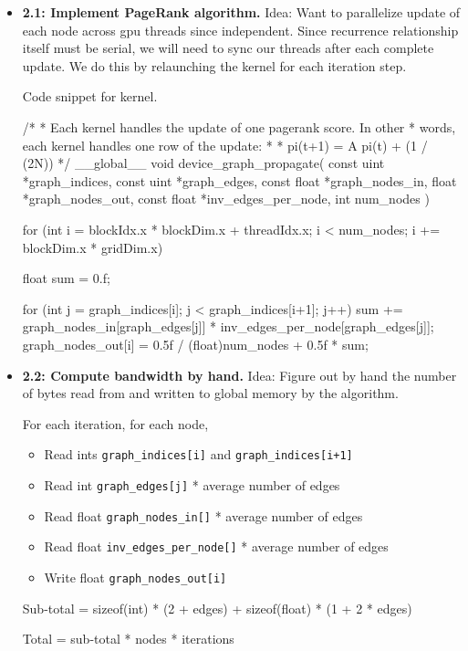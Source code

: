 \documentclass[12pt,letterpaper,twoside]{article}
\begin{document}
\begin{itemize}
    \item \textbf{2.1: Implement PageRank algorithm.} Idea: Want to parallelize
    update of each node across gpu threads since independent. Since recurrence 
    relationship itself must be serial, we will need to sync our threads after 
    each complete update. We do this by relaunching the kernel for each 
    iteration step.

    Code snippet for kernel.
\begin{cpp}
/* 
* Each kernel handles the update of one pagerank score. In other
* words, each kernel handles one row of the update:
*
*      pi(t+1) = A pi(t) + (1 / (2N))
*/
__global__ void device_graph_propagate(
    const uint *graph_indices,
    const uint *graph_edges,
    const float *graph_nodes_in,
    float *graph_nodes_out,
    const float *inv_edges_per_node,
    int num_nodes
) {
    for (int i = blockIdx.x * blockDim.x + threadIdx.x;
        i < num_nodes;
    i += blockDim.x * gridDim.x) 
    {
        float sum = 0.f;    

        for (int j = graph_indices[i]; j < graph_indices[i+1]; j++) 
        {
        sum += graph_nodes_in[graph_edges[j]] * 
            inv_edges_per_node[graph_edges[j]];
        }
        graph_nodes_out[i] = 0.5f / (float)num_nodes + 0.5f * sum;
    }
}
\end{cpp}

    \item \textbf{2.2: Compute bandwidth by hand.} Idea: Figure out by hand the number 
    of bytes read from and written to global memory by the algorithm.

    For each iteration, for each node,
    \begin{itemize}
        \item Read ints \texttt{graph\_indices[i]} and \texttt{graph\_indices[i+1]} 
        \item Read int \texttt{graph\_edges[j]} * average number of edges
        \item Read float \texttt{graph\_nodes\_in[]} * average number of edges
        \item Read float \texttt{inv\_edges\_per\_node[]} * average number of edges
        \item Write float \texttt{graph\_nodes\_out[i]}
    \end{itemize}
    Sub-total = sizeof(int) * (2 + edges) + sizeof(float) * (1 + 2 * edges)

    Total = sub-total * nodes * iterations


\end{itemize}
\end{document}
